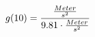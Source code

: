 \documentclass[preview]{standalone}
\begin{document}
\begin{align*}
\special{dvisvgm:raw <g id='unique000'>}g(10) = \frac{\frac{Meter}{s^{2}}}{9.81 \cdot \frac{Meter}{s^{2}}}\special{dvisvgm:raw </g>}
\end{align*}
\end{document}
